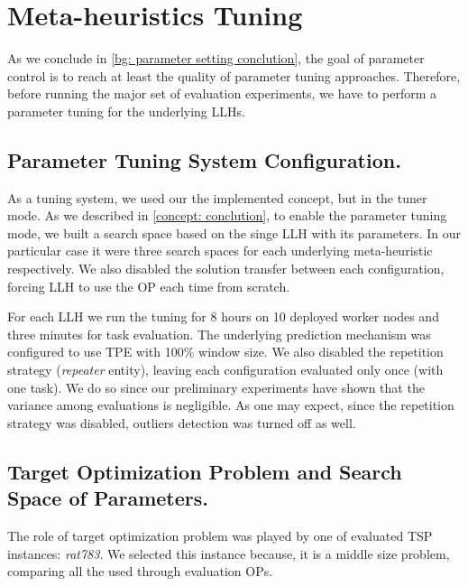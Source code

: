 \section{Meta-heuristics Tuning}\label{eval: mh tuning}
As we conclude in \cref{bg: parameter setting conclution}, the goal of parameter control is to reach at least the quality of parameter tuning approaches. Therefore, before running the major set of evaluation experiments, we have to perform a parameter tuning for the underlying LLHs.

\subsection{Parameter Tuning System Configuration.} 
As a tuning system, we used our the implemented concept, but in the tuner mode. As we described in \cref{concept: conclution}, to enable the parameter tuning mode, we built a search space based on the singe LLH with its parameters. In our particular case it were three search spaces for each underlying meta-heuristic respectively. We also disabled the solution transfer between each configuration, forcing LLH to use the OP each time from scratch.

For each LLH we run the tuning for 8 hours on 10 deployed worker nodes and three minutes for task evaluation. The underlying prediction mechanism was configured to use TPE with 100\% window size. We also disabled the repetition strategy (\emph{repeater} entity), leaving each configuration evaluated only once (with one task). We do so since our preliminary experiments have shown that the variance among evaluations is negligible. As one may expect, since the repetition strategy was disabled, outliers detection was turned off as well.

\subsection{Target Optimization Problem and Search Space of Parameters.} 
The role of target optimization problem was played by one of evaluated TSP instances: \emph{rat783}. We selected this instance because, it is a middle size problem, comparing all the used through evaluation OPs.

